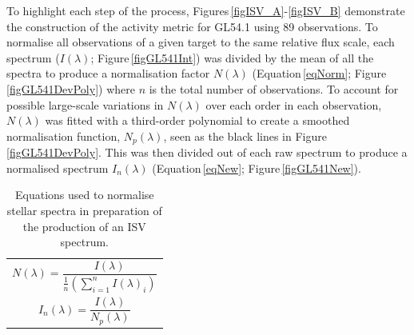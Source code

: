 To highlight each step of the process, Figures\,\ref{figISV_A}-\ref{figISV_B} demonstrate the construction of the activity metric for GL54.1 using 89 observations. To normalise all observations of a given target to the same relative flux scale, each spectrum ($I(\lambda)$; Figure\,\ref{figGL541Int}) was divided by the mean of all the spectra to produce a normalisation factor $N(\lambda)$ (Equation\,\ref{eqNorm}; Figure\,\ref{figGL541DevPoly}) where $n$ is the total number of observations. To account for possible large-scale variations in $N(\lambda)$ over each order in each observation, $N(\lambda)$ was fitted with a third-order polynomial to create a smoothed normalisation function, $N_p(\lambda)$, seen as the black lines in Figure\,\ref{figGL541DevPoly}. This was then divided out of each raw spectrum to produce a normalised spectrum $I_{n}(\lambda)$ (Equation\,\ref{eqNew}; Figure\,\ref{figGL541New}).\\

\begin{table}[]
    \centering
    \begin{tabular}{|c|}
    \hline
    \vbox{\begin{equation}N(\lambda) = \frac{I(\lambda)}{\frac{1}{n}(\sum\limits_{i=1}^n I(\lambda)_{i})}\label{eqNorm}\end{equation}}\\
    \vbox{\begin{equation}I_{n}(\lambda) = \frac{I(\lambda)}{N_{p}(\lambda)}\label{eqNew}\end{equation}}\\
    \hline
    \end{tabular}
    \caption{Equations used to normalise stellar spectra in preparation of the production of an ISV spectrum.}
    \label{tabISVprep}
\end{table}
